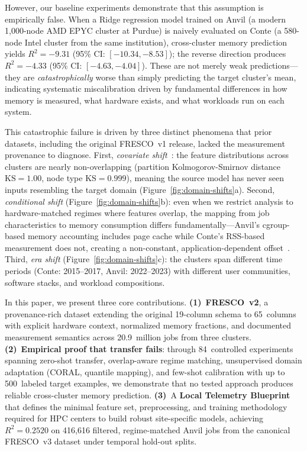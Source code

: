 \documentclass[sigconf]{acmart}
\begin{document}
However, our baseline experiments demonstrate that this assumption is empirically false.
When a Ridge regression model trained on Anvil (a modern 1,000-node AMD EPYC cluster at Purdue) is naively evaluated on Conte (a 580-node Intel cluster from the same institution), cross-cluster memory prediction yields $R^2 = -9.31$ (95\% CI: $[-10.34, -8.53]$); the reverse direction produces $R^2 = -4.33$ (95\% CI: $[-4.63, -4.04]$).
These are not merely weak predictions---they are \emph{catastrophically} worse than simply predicting the target cluster's mean, indicating systematic miscalibration driven by fundamental differences in how memory is measured, what hardware exists, and what workloads run on each system.

This catastrophic failure is driven by three distinct phenomena that prior datasets, including the original FRESCO~v1 release, lacked the measurement provenance to diagnose.
First, \emph{covariate shift}~\cite{domain_adaptation_survey_2021}: the feature distributions across clusters are nearly non-overlapping (partition Kolmogorov-Smirnov distance~\cite{massey1951kolmogorov} $\text{KS} = 1.00$, node type $\text{KS} = 0.999$), meaning the source model has never seen inputs resembling the target domain (Figure~\ref{fig:domain-shifts}a).
Second, \emph{conditional shift} (Figure~\ref{fig:domain-shifts}b): even when we restrict analysis to hardware-matched regimes where features overlap, the mapping from job characteristics to memory consumption differs fundamentally---Anvil's cgroup-based memory accounting includes page cache while Conte's RSS-based measurement does not, creating a non-constant, application-dependent offset~\cite{peng2022memory}.
Third, \emph{era shift} (Figure~\ref{fig:domain-shifts}c): the clusters span different time periods (Conte: 2015--2017, Anvil: 2022--2023) with different user communities, software stacks, and workload compositions.

In this paper, we present three core contributions.
\textbf{(1)}~\textbf{FRESCO~v2}, a provenance-rich dataset extending the original 19-column schema to 65~columns with explicit hardware context, normalized memory fractions, and documented measurement semantics across 20.9~million jobs from three clusters.
\textbf{(2)}~\textbf{Empirical proof that transfer fails}: through 84~controlled experiments spanning zero-shot transfer, overlap-aware regime matching, unsupervised domain adaptation (CORAL, quantile mapping), and few-shot calibration with up to 500~labeled target examples, we demonstrate that no tested approach produces reliable cross-cluster memory prediction.
\textbf{(3)}~A \textbf{Local Telemetry Blueprint} that defines the minimal feature set, preprocessing, and training methodology required for HPC centers to build robust site-specific models, achieving $R^2 = 0.2520$ on 416,616 filtered, regime-matched Anvil jobs from the canonical FRESCO~v3 dataset under temporal hold-out splits.
\end{document}
